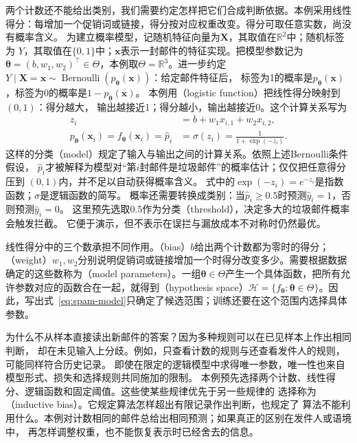两个计数还不能给出类别，我们需要约定怎样把它们合成判断依据。本例采用线性得分：每增加一个促销词或链接，得分按对应权重改变。得分可取任意实数，尚没有概率含义。
为建立概率模型，记随机特征向量为$\bm{X}$，其取值在$\mathbb{R}^2$中；随机标签为
$Y$，其取值在$\{0,1\}$中；$\bm{x}$表示一封邮件的特征实现。把模型参数记为
$\bm{\theta}=(b,w_1,w_2)^{\top}\in\Theta$，本例取$\Theta=\mathbb{R}^3$。进一步约定
$Y\mid\bm{X}=\bm{x}\sim\operatorname{Bernoulli}(p_{\bm{\theta}}(\bm{x}))$：给定邮件特征后，
标签为1的概率是$p_{\bm{\theta}}(\bm{x})$，标签为0的概率是$1-p_{\bm{\theta}}(\bm{x})$。
本例用（logistic function）把线性得分映射到$(0,1)$：得分越大，
输出越接近1；得分越小，输出越接近0。这个计算关系写为
\begin{align}
  z_i &= b+w_1x_{i,1}+w_2x_{i,2}, \\
  p_{\bm{\theta}}(\bm{x}_i)
  =f_{\bm{\theta}}(\bm{x}_i)
  =\hat{p}_i
  &=\sigma(z_i)=\frac{1}{1+\exp(-z_i)}.
  \label{eq:spam-model}
\end{align}
这样的分类（model）规定了输入与输出之间的计算关系。依照上述Bernoulli条件假设，
$\hat{p}_i$才被解释为模型对“第$i$封邮件是垃圾邮件”的概率估计；仅仅把任意得分压到
$(0,1)$内，并不足以自动获得概率含义。
式中的$\exp(-z_i)=e^{-z_i}$是指数函数；$\sigma$是逻辑函数的简写。
概率还需要转换成类别：当$\hat{p}_i\geq 0.5$时预测$\hat{y}_i=1$，否则预测$\hat{y}_i=0$。
这里预先选取$0.5$作为分类（threshold），决定多大的垃圾邮件概率会触发拦截。
它便于演示，但不表示在误拦与漏放成本不对称时仍然最优。

线性得分中的三个数承担不同作用。（bias）$b$给出两个计数都为零时的得分；（weight）$w_1,w_2$分别说明促销词或链接增加一个时得分改变多少。需要根据数据确定的这些数称为（model parameters）。一组$\bm{\theta}\in\Theta$产生一个具体函数，把所有允许参数对应的函数合在一起，就得到（hypothesis space）$\mathcal H=\{f_{\bm{\theta}}:\bm{\theta}\in\Theta\}$。因此，写出式~\eqref{eq:spam-model}只确定了候选范围；训练还要在这个范围内选择具体参数。

为什么不从样本直接读出新邮件的答案？因为多种规则可以在已见样本上作出相同判断，
却在未见输入上分歧。例如，只查看计数的规则与还查看发件人的规则，可能同样符合历史记录。
即使在限定的逻辑模型中求得唯一参数，唯一性也来自模型形式、损失和选择规则共同施加的限制。
本例预先选择两个计数、线性得分、逻辑函数和固定阈值。这些使某些规律优先于另一些规律的
选择称为（inductive bias）。它规定算法怎样超出有限记录作出判断，也规定了
算法不能利用什么。本例对计数相同的邮件总给出相同预测；如果真正的区别在发件人或语境中，
再怎样调整权重，也不能恢复表示时已经舍去的信息。

